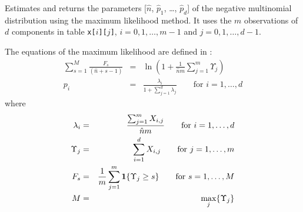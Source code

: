 \begin{tabb}
   Estimates  and returns the parameters [$\hat{n}$, $\hat{p}_1$, \ldots,
  $\hat{p}_d$]
   of the negative multinomial distribution using the maximum likelihood method.
   It uses the $m$ observations of $d$ components in table
   \texttt{x[$i$][$j$]}, $i = 0, 1, \ldots, m-1$ and $j = 0, 1, \ldots, d-1$.
   \begin{detailed}
   The equations of the maximum likelihood are defined in \cite{tJOH69a}:
   \begin{eqnarray*}
      \sum_{s=1}^{M} \frac{F_s}{(\hat{n} + s - 1)} & = & \ln \left(1 +
        \frac{1}{\hat{n} m} \sum_{j=1}^{m} \Upsilon_j \right)\\[8pt]
      p_i & = & \frac{\lambda_i}{1 + \sum_{j=1}^{d} \lambda_j}
                 \qquad \mbox{for } i=1, \ldots,d
   \end{eqnarray*}
   where
   \begin{eqnarray*}
      \lambda_i & = & \frac{\sum_{j=1}^{m} X_{i,j}}{\hat{n} m}
             \qquad \mbox{for } i=1, \ldots,d\\
      \Upsilon_j & = & \sum_{i=1}^{d} X_{i,j} \qquad \mbox{for } j=1, \ldots,m\\
      F_s & = & \frac{1}{m} \sum_{j=1}^{m} \mbox{\textbf{1}}\{\Upsilon_j \ge s\}
        \qquad \mbox{for } s=1, \ldots,M\\
      M & = & \max_j \{\Upsilon_j\}
   \end{eqnarray*}
   \end{detailed}
\end{tabb}
\begin{htmlonly}
\end{htmlonly}
